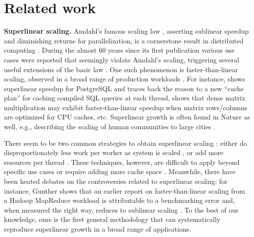 \section{Related work}
\label{sec:related-work}

\noindent%
\textbf{Superlinear scaling.} %
Amdahl's famous scaling law \cite{10.1145/1465482.1465560}, asserting sublinear speedup and diminishing returns for parallelization, is a cornerstone result in distributed computing \cite{10.1145/42411.42415, 10.5555/775339.775386,1580395, 10.5555/1951599, 10.1145/42411.42415}. During the almost 60 years since its first publication various use cases were reported that seemingly violate Amdahl's scaling, triggering several useful extensions of the basic law \cite{4563876, 6280307, 406581, 6163449, 10.5555/1951599}. One such phenomenon is faster-than-linear scaling, observed in a broad range of production workloads \cite{scalability-analyzed, 10.1145/3627703.3629574, 10.5555/1012889.1012894, sdn-analytitcs, 556383, 7733347, 6483679, 10.1007/978-3-319-77610-1,dobb-1, dobb-2}. For instance, \cite{scalability-analyzed} shows superlinear speedup for PostgreSQL and traces back the reason to a new ``cache plan'' for caching compiled SQL queries at each thread, \cite{7733347} shows that dense matrix multiplication may exhibit faster-than-linear speedup when matrix rows\slash columns are optimized for CPU caches, etc. Superlinear growth is often found in Nature as well, e.g., describing the scaling of human communities to large cities \cite{PhysRevE.79.016115}.

There seem to be two common strategies to obtain superlinear scaling \cite{7733347, 80148}: either do disproportionately less work per worker as system is scaled \cite{7733347}, or add more resources per thread \cite{80148}. These techniques, however, are difficult to apply beyond specific use cases \cite{556383} or require adding more cache space \cite{7733347}. Meanwhile, there have been heated debates on the controversies related to superlinear scaling: for instance, Gunther shows that an earlier report on faster-than-linear scaling from a Hadoop MapReduce workload is attributable to a benchmarking error and, when measured the right way, reduces to sublinear scaling \cite{10.1016/0167-8191(86)90024-4}. %
To the best of our knowledge, ours is the first general methodology that can systematically reproduce superlinear growth in a broad range of applications.

